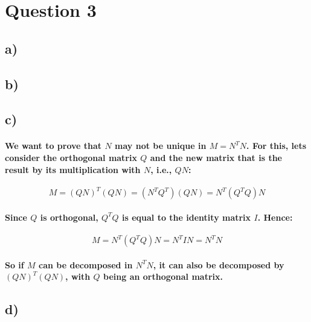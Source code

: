 \documentclass[a4paper]{article}    %
\begin{document}
\section*{Question 3}

\subsection*{a)}

\subsection*{b)}

\subsection*{c)}

\paragraph{We want to prove that $N$ may not be unique in $M=N^TN$. For this, lets consider the orthogonal matrix $Q$ and the new matrix that is the result by its multiplication with $N$, i.e., $QN$:}
    \[M = (QN)^T(QN) = (N^TQ^T)(QN) = N^T(Q^TQ)N\]

\paragraph{Since $Q$ is orthogonal, $Q^TQ$ is equal to the identity matrix $I$. Hence:}
    \[M= N^T(Q^TQ)N = N^TIN = N^TN\]

\paragraph{So if $M$ can be decomposed in $N^TN$, it can also be decomposed by $(QN)^T(QN)$, with $Q$ being an orthogonal matrix.}

\subsection*{d)}


\newpage

\end{document}
